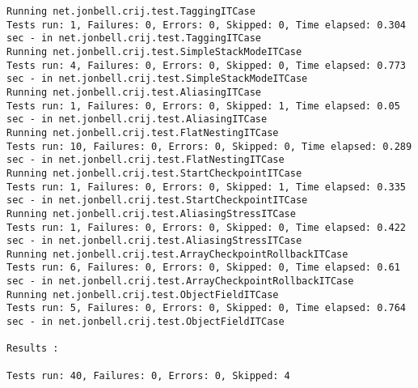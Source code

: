 \documentclass[12pt]{article}
\begin{document}
\begin{scriptsize}
\begin{verbatim}
Running net.jonbell.crij.test.TaggingITCase
Tests run: 1, Failures: 0, Errors: 0, Skipped: 0, Time elapsed: 0.304 sec - in net.jonbell.crij.test.TaggingITCase
Running net.jonbell.crij.test.SimpleStackModeITCase
Tests run: 4, Failures: 0, Errors: 0, Skipped: 0, Time elapsed: 0.773 sec - in net.jonbell.crij.test.SimpleStackModeITCase
Running net.jonbell.crij.test.AliasingITCase
Tests run: 1, Failures: 0, Errors: 0, Skipped: 1, Time elapsed: 0.05 sec - in net.jonbell.crij.test.AliasingITCase
Running net.jonbell.crij.test.FlatNestingITCase
Tests run: 10, Failures: 0, Errors: 0, Skipped: 0, Time elapsed: 0.289 sec - in net.jonbell.crij.test.FlatNestingITCase
Running net.jonbell.crij.test.StartCheckpointITCase
Tests run: 1, Failures: 0, Errors: 0, Skipped: 1, Time elapsed: 0.335 sec - in net.jonbell.crij.test.StartCheckpointITCase
Running net.jonbell.crij.test.AliasingStressITCase
Tests run: 1, Failures: 0, Errors: 0, Skipped: 0, Time elapsed: 0.422 sec - in net.jonbell.crij.test.AliasingStressITCase
Running net.jonbell.crij.test.ArrayCheckpointRollbackITCase
Tests run: 6, Failures: 0, Errors: 0, Skipped: 0, Time elapsed: 0.61 sec - in net.jonbell.crij.test.ArrayCheckpointRollbackITCase
Running net.jonbell.crij.test.ObjectFieldITCase
Tests run: 5, Failures: 0, Errors: 0, Skipped: 0, Time elapsed: 0.764 sec - in net.jonbell.crij.test.ObjectFieldITCase

Results :

Tests run: 40, Failures: 0, Errors: 0, Skipped: 4
\end{verbatim}

\label{sec:last}
\end{scriptsize}
\end{document}
